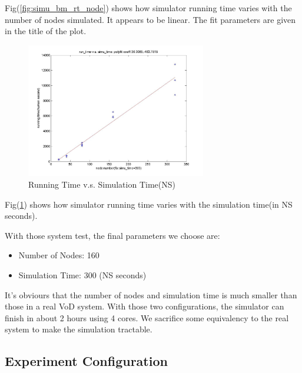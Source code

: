 \documentclass[11pt,a4paper]{article}
\begin{document}
Fig(\ref{fig:simu_bm_rt_node}) shows how simulator running time 
varies with the number of nodes simulated. 
It appears to be linear. The fit parameters are given in 
the title of the plot. 


\begin{figure}[htb]
\centering
	\includegraphics[width=0.7\textwidth]{../fig/runtime_vs_simutime.jpg}
	\caption{Running Time v.s. Simulation Time(NS)}
	\label{fig:simu_bm_rt_st}
\end{figure}

Fig(\ref{fig:simu_bm_rt_st}) shows how simulator running time
varies with the simulation time(in NS seconds). 

With those system test, the final parameters we choose are:
\begin{itemize}
	\item Number of Nodes: 160
	\item Simulation Time: 300 (NS seconds)
\end{itemize}

It's obviours that the number of nodes and simulation time 
is much smaller than those in a real VoD system. With those 
two configurations, the simulator can finish in about 2 hours
using 4 cores. We sacrifice some equivalency to the real system 
to make the simulation tractable. 

\subsection{Experiment Configuration}
\end{document}
